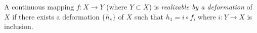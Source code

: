 A continuous mapping $f: X \to Y$ (where $Y \subset X$) is \textit{realizable by a deformation} of $X$ if there exists a deformation $\{h_s\}$ of $X$ such that $h_1 = i \circ f$, where $i: Y \to X$ is inclusion.
